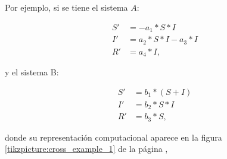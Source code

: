 Por ejemplo, si se tiene el sistema $A$:

\begin{align*}
    S' & = - a_1 * S * I         \\
    I' & = a_2 * S * I - a_3 * I \\
    R' & = a_4 * I,
\end{align*}

y el sistema B:

\begin{align*}
    S' & = b_1 * (S + I) \\
    I' & = b_2 * S * I   \\
    R' & = b_3 * S,
\end{align*}

donde su representación computacional aparece en la figura \ref{tikzpicture:cross_example_1} de la página \pageref{tikzpicture:cross_example_1},

